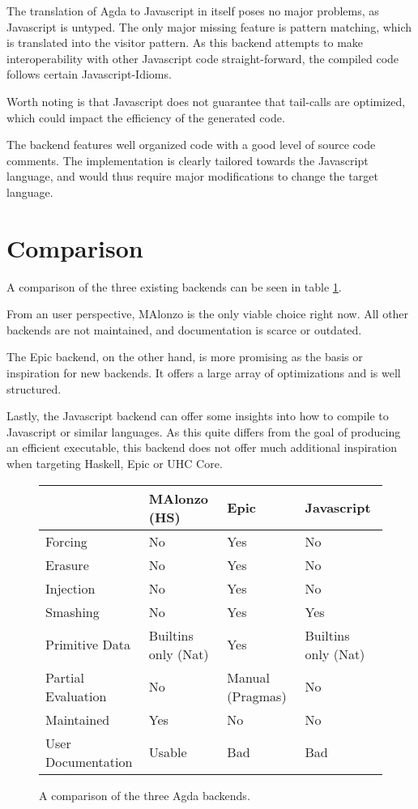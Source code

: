 \documentclass[12pt, a4paper, twoside]{report}
\begin{document}
The translation of Agda to Javascript in itself poses no major problems, as Javascript is untyped. The
only major missing feature is pattern matching, which is translated into the visitor pattern.
As this backend attempts to make interoperability
with other Javascript code straight-forward, the compiled code follows certain Javascript-Idioms.

Worth noting is that Javascript does not guarantee that tail-calls are optimized, which could impact
the efficiency of the generated code.

The backend features well organized code with a good level of source code comments. The implementation
is clearly tailored towards the Javascript language, and would thus require major modifications to change the
target language.


\section{Comparison}
A comparison of the three existing backends can be seen in table \ref{tbl:backends-comp}.

From an user perspective, MAlonzo is the only viable choice right now. All other backends
are not maintained, and documentation is scarce or outdated.

The Epic backend, on the other hand, is more promising as the basis or inspiration for new backends.
It offers a large array of optimizations and is well structured.

Lastly, the Javascript backend can offer some insights into how to
compile to Javascript or similar languages. As this quite differs from
the goal of producing an efficient executable, this backend does not offer much
additional inspiration when targeting Haskell, Epic or UHC Core.

\begin{figure}
\begin{tabular}{l | l | l | l}
& MAlonzo (HS) & Epic & Javascript \\
\hline
Forcing & No & Yes & No \\
Erasure & No & Yes & No \\
Injection & No & Yes & No \\
Smashing & No & Yes & Yes \\
Primitive Data & Builtins only (Nat) & Yes & Builtins only (Nat) \\
Partial Evaluation & No & Manual (Pragmas) & No \\
\hline
Maintained & Yes & No & No \\
User Documentation & Usable & Bad & Bad \\
\hline
\end{tabular}
\caption{A comparison of the three Agda backends.}
\label{tbl:backends-comp}
\end{figure}
\end{document}
